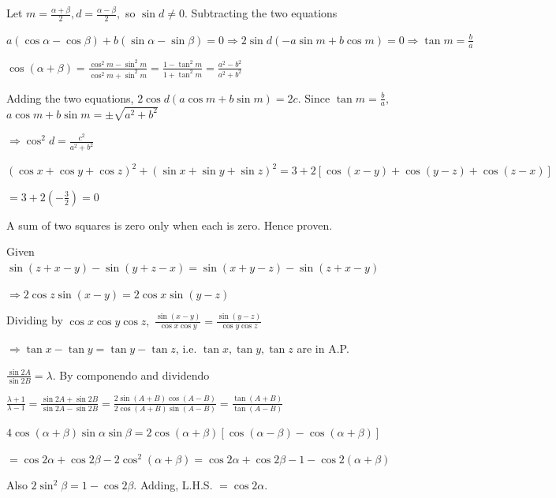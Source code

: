 \item Let $m = \frac{\alpha + \beta}{2}, d = \frac{\alpha - \beta}{2},$ so $\sin d \ne 0$. Subtracting the two equations

  $a(\cos\alpha - \cos\beta) + b(\sin\alpha - \sin\beta) = 0 \Rightarrow 2\sin d(-a\sin m + b\cos m) = 0 \Rightarrow \tan m =
  \frac{b}{a}$

  $\cos(\alpha + \beta) = \frac{\cos^2 m - \sin^2 m}{\cos^2 m + \sin^2 m} = \frac{1 - \tan^2 m}{1 + \tan^2 m} = \frac{a^2 -
  b^2}{a^2 + b^2}$

  Adding the two equations, $2\cos d(a\cos m + b\sin m) = 2c$. Since $\tan m = \frac{b}{a},$ $a\cos m + b\sin m = \pm\sqrt{a^2
  + b^2}$

  $\Rightarrow \cos^2 d = \frac{c^2}{a^2 + b^2}$

\item $(\cos x + \cos y + \cos z)^2 + (\sin x + \sin y + \sin z)^2 = 3 + 2[\cos(x - y) + \cos(y - z) + \cos(z - x)]$

  $= 3 + 2\left(-\frac{3}{2}\right) = 0$

  A sum of two squares is zero only when each is zero. Hence proven.

\item Given $\sin(z + x - y) - \sin(y + z - x) = \sin(x + y - z) - \sin(z + x - y)$

  $\Rightarrow 2\cos z\sin(x - y) = 2\cos x\sin(y - z)$

  Dividing by $\cos x\cos y\cos z,$ $\frac{\sin(x - y)}{\cos x\cos y} = \frac{\sin(y - z)}{\cos y\cos z}$

  $\Rightarrow \tan x - \tan y = \tan y - \tan z$, i.e. $\tan x, \tan y, \tan z$ are in A.P.

\item $\frac{\sin 2A}{\sin 2B} = \lambda$. By componendo and dividendo

  $\frac{\lambda + 1}{\lambda - 1} = \frac{\sin 2A + \sin 2B}{\sin 2A - \sin 2B} = \frac{2\sin(A + B)\cos(A - B)}{2\cos(A +
  B)\sin(A - B)} = \frac{\tan(A + B)}{\tan(A - B)}$

\item $4\cos(\alpha + \beta)\sin\alpha\sin\beta = 2\cos(\alpha + \beta)[\cos(\alpha - \beta) - \cos(\alpha + \beta)]$

  $= \cos 2\alpha + \cos 2\beta - 2\cos^2(\alpha + \beta) = \cos 2\alpha + \cos 2\beta - 1 - \cos 2(\alpha + \beta)$

  Also $2\sin^2\beta = 1 - \cos 2\beta$. Adding, L.H.S. $= \cos 2\alpha$.

